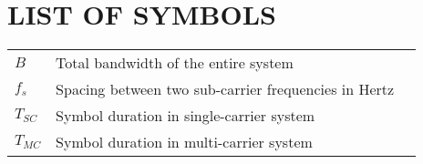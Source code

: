 \section*{LIST OF SYMBOLS}
 {}

\begin{tabularx}{0.9\textwidth}{ L{0.4} L{1.3} L{1.3} }
    $B$ & Total bandwidth of the entire system \\ %
    $f_s$ & Spacing between two sub-carrier frequencies in Hertz \\
    $T_{SC}$ & Symbol duration in single-carrier system \\ 
    $T_{MC}$ & Symbol duration in multi-carrier system \\ 
\end{tabularx}

\newpage